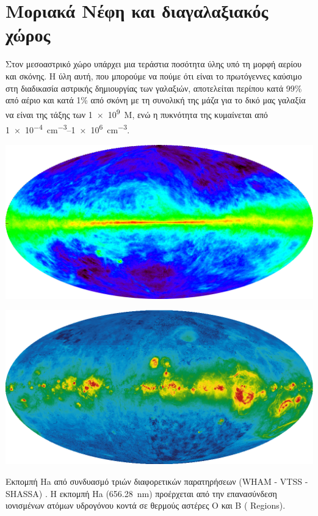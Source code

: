 \section{Μοριακά Νέφη και διαγαλαξιακός χώρος}
Στον μεσοαστρικό χώρο υπάρχει μια τεράστια ποσότητα ύλης υπό τη μορφή αερίου και σκόνης. Η ύλη αυτή, που μπορούμε να πούμε ότι είναι το πρωτόγεννες καύσιμο στη διαδικασία αστρικής δημιουργίας των γαλαξιών, αποτελείται περίπου κατά 99\% από αέριο και κατά 1\% από σκόνη με τη συνολική της μάζα για το δικό μας γαλαξία να είναι της τάξης των \SI{1e9}{ M_{\odot}}, ενώ η πυκνότητα της κυμαίνεται από \SIrange{1e-4}{1e6}{cm^{-3}}.

\begin{marginfigure}
	\label{fig:21}
	\centering
	\includegraphics[width=1\linewidth]{Images/21.png}
	\caption{Εκπομπή του  στα 21.1 cm (Kalberla et al., 2005)%
		H εκπομπή της γραμμής \SI{21}{cm} στα ραδιοκύματα που οφείλεται στη μετάπτωση αντιστροφής του spin του πρωτονίου και του ηλεκτρονίου στη βασική κατάσταση του ατόμου του Υδρογόνου. Η ενεργειακή διαφορά των καταστάσεων είναι 
		$h \nu=\SI{6e-6}{eV}$, η οποία αντιστοιχεί σε μήκος κύματος \SI{21}{cm}.}
\end{marginfigure}

\begin{marginfigure}
	\label{fig:Ha}
	\centering
	\includegraphics[width=1\linewidth]{Images/Ha.png}
	\caption{Εκπομπή Ha από συνδυασμό τριών διαφορετικών παρατηρήσεων (WHAM - VTSS - SHASSA) \cite{finkbeiner_2003}. Η εκπομπή Ha (\SI{656.28}{nm}) προέρχεται από την επανασύνδεση ιονισμένων ατόμων υδρογόνου κοντά σε θερμούς αστέρες O και B ( Regions).}
\end{marginfigure}


